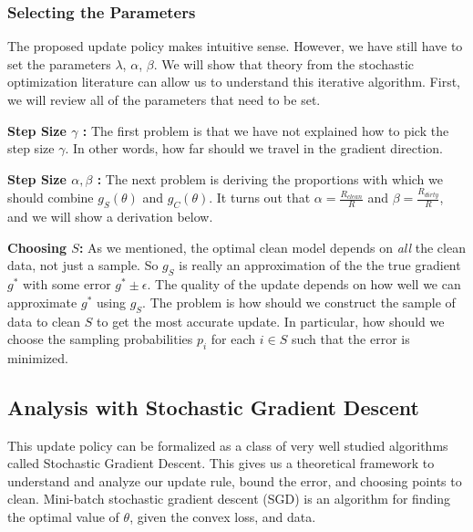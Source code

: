 \subsubsection{Selecting the Parameters}
The proposed update policy makes intuitive sense.
However, we have still have to set the parameters $\lambda$, $\alpha$, $\beta$.
We will show that theory from the stochastic optimization literature can allow us to understand this iterative algorithm.
First, we will review all of the parameters that need to be set.

\vspace{0.5em}

\noindent\textbf{Step Size $\gamma$ : } The first problem is that we have not explained how to pick the step size $\gamma$. In other words, how far should we travel in the gradient direction.

\vspace{0.5em}

\noindent\textbf{Step Size $\alpha,\beta$ : } The next problem is deriving the proportions with which we should combine $g_S(\theta)$ and $g_C(\theta)$. It turns out that $\alpha = \frac{R_{clean}}{R}$ and $\beta = \frac{R_{dirty}}{R}$, and we will show a derivation below.

\vspace{0.5em}

\noindent\textbf{Choosing $S$: } As we mentioned, the optimal clean model depends on \emph{all} the clean data, not just a sample. 
So $g_S$ is really an approximation of the the true gradient $g^*$ with some error $g^* \pm \epsilon$. 
The quality of the update depends on how well we can approximate $g^*$ using $g_S$.
The problem is how should we construct the sample of data to clean $S$ to get the most accurate update.
In particular, how should we choose the sampling probabilities $p_i$ for each $i \in S$ such that the error is minimized.

\subsection{Analysis with Stochastic Gradient Descent}\label{sgd}
This update policy can be formalized as a class of very well studied algorithms called Stochastic Gradient Descent.
This gives us a theoretical framework to understand and analyze our update rule, bound the error, and choosing points to clean.
Mini-batch stochastic gradient descent (SGD) is an algorithm for finding the optimal value
of $\theta$, given the convex loss, and data.

